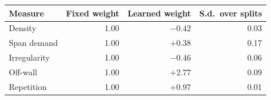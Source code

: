 \begin{tabular}{lrrr}
\toprule
Measure & Fixed weight & Learned weight & S.d.\ over splits \\
\midrule
Density & 1.00 & $-0.42$ & 0.03 \\
Span demand & 1.00 & $+0.38$ & 0.17 \\
Irregularity & 1.00 & $-0.46$ & 0.06 \\
Off-wall & 1.00 & $+2.77$ & 0.09 \\
Repetition & 1.00 & $+0.97$ & 0.01 \\
\bottomrule
\end{tabular}